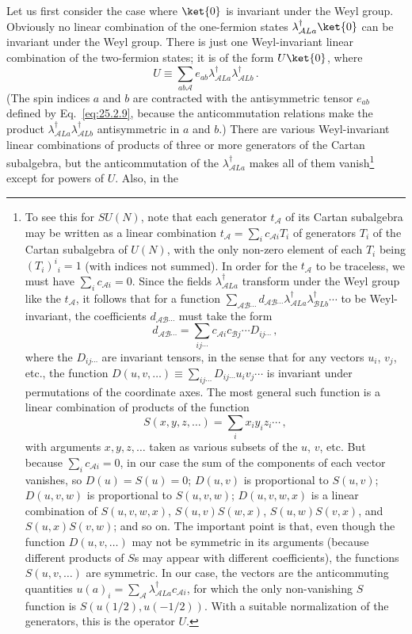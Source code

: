 Let us first consider the case where \(\ket{0}\) is invariant under the Weyl
group. Obviously no linear combination of the one-fermion states
\(\lambda_{\mathcal A La}^\dagger\ket{0}\) can be invariant under the Weyl group.
There is just one Weyl-invariant linear combination of the two-fermion
states; it is of the form \(U\ket{0}\), where
\begin{equation}
  U\equiv
  \sum_{ab\mathcal A}
  e_{ab}\lambda_{\mathcal A La}^\dagger
  \lambda_{\mathcal A Lb}^\dagger\,.
  \tag{29.4.12}\label{eq:29.4.12}
\end{equation}
(The spin indices \(a\) and \(b\) are contracted with the antisymmetric
tensor \(e_{ab}\) defined by Eq.~\eqref{eq:25.2.9}, because the
anticommutation relations make the product
\(\lambda_{\mathcal A La}^\dagger\lambda_{\mathcal A Lb}^\dagger\)
antisymmetric in
\(a\) and \(b\).) There are various Weyl-invariant linear combinations of
products of three or more generators of the Cartan subalgebra, but the
anticommutation of the \(\lambda_{\mathcal A La}^\dagger\) makes all of them
vanish\footnote{To see this for \(SU(N)\), note that each generator
\(t_{\mathcal A}\) of its Cartan subalgebra may be written as a linear
combination \(t_{\mathcal A}=\sum_i c_{\mathcal A i}T_i\) of generators
\(T_i\) of the Cartan subalgebra of \(U(N)\), with the only non-zero
element of each \(T_i\) being \((T_i)^i{}_i=1\) (with indices not summed).
In order for the \(t_{\mathcal A}\) to be traceless, we must have
\(\sum_i c_{\mathcal A i}=0\). Since the fields
\(\lambda_{\mathcal A La}^\dagger\) transform under the Weyl group like the
\(t_{\mathcal A}\), it follows that for a function
\(\sum_{\mathcal A\mathcal B\cdots}
d_{\mathcal A\mathcal B\cdots}
\lambda_{\mathcal A La}^\dagger\lambda_{\mathcal B Lb}^\dagger\cdots\)
to be
Weyl-invariant, the coefficients \(d_{\mathcal A\mathcal B\cdots}\) must
take the form
\[
  d_{\mathcal A\mathcal B\cdots}
  =
  \sum_{ij\cdots}
  c_{\mathcal A i}c_{\mathcal B j}\cdots D_{ij\cdots}\,,
\]
where the \(D_{ij\cdots}\) are invariant tensors, in the sense that for any
vectors \(u_i\), \(v_j\), etc., the function
\(D(u,v,\ldots)\equiv\sum_{ij\cdots}D_{ij\cdots}u_iv_j\cdots\) is
invariant under permutations of the coordinate axes. The most general such
function is a linear combination of products of the function
\[
  S(x,y,z,\ldots)=\sum_i x_i y_i z_i\cdots\,,
\]
with arguments \(x,y,z,\ldots\) taken as various subsets of the \(u\),
\(v\), etc. But because \(\sum_i c_{\mathcal A i}=0\), in our case the
sum of the components of each vector vanishes, so \(D(u)=S(u)=0\);
\(D(u,v)\) is proportional to \(S(u,v)\); \(D(u,v,w)\) is proportional to
\(S(u,v,w)\); \(D(u,v,w,x)\) is a linear combination of
\(S(u,v,w,x)\), \(S(u,v)S(w,x)\), \(S(u,w)S(v,x)\), and
\(S(u,x)S(v,w)\); and so on. The important point is that, even though the
function \(D(u,v,\ldots)\) may not be symmetric in its arguments (because
different products of \(S\)s may appear with different coefficients), the
functions \(S(u,v,\ldots)\) are symmetric. In our case, the vectors are
the anticommuting quantities
\(u(a)_i=\sum_{\mathcal A}
\lambda_{\mathcal A La}^\dagger c_{\mathcal A i}\),
for which the only non-vanishing \(S\) function is
\(S(u(1/2),u(-1/2))\). With a suitable normalization of the generators,
this is the operator \(U\).} except for powers of \(U\). Also, in the
